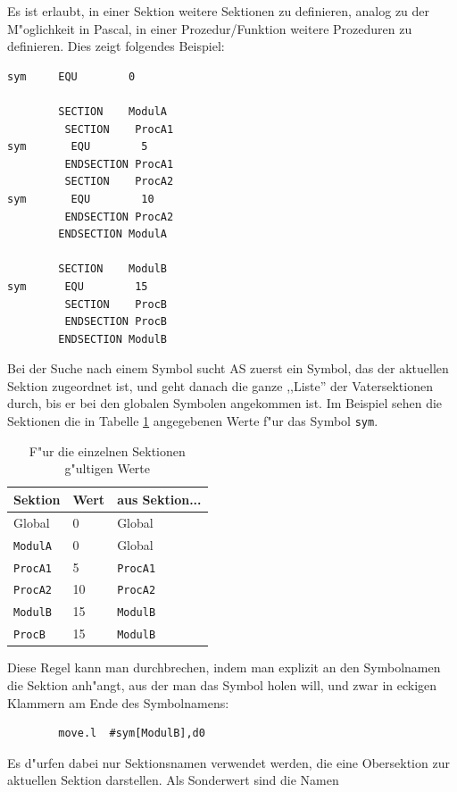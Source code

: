 \documentclass[12pt,a4paper,twoside]{report}
\newcommand{\tty}[1]{{\tt #1}}
\newcommand{\asname}{AS}
\begin{document}
Es ist erlaubt, in einer Sektion weitere Sektionen zu definieren, analog
zu der M"oglichkeit in Pascal, in einer Prozedur/Funktion weitere
Prozeduren zu definieren.  Dies zeigt folgendes Beispiel:
\begin{verbatim}
sym     EQU        0

        SECTION    ModulA
         SECTION    ProcA1
sym       EQU        5
         ENDSECTION ProcA1
         SECTION    ProcA2
sym       EQU        10
         ENDSECTION ProcA2
        ENDSECTION ModulA

        SECTION    ModulB
sym      EQU        15
         SECTION    ProcB
         ENDSECTION ProcB
        ENDSECTION ModulB
\end{verbatim}
Bei der Suche nach einem Symbol sucht \asname{} zuerst ein Symbol, das der aktuellen
Sektion zugeordnet ist, und geht danach die ganze ,,Liste'' der Vatersektionen
durch, bis er bei den globalen Symbolen angekommen ist.  Im Beispiel sehen
die Sektionen die in Tabelle \ref{TabSymErg} angegebenen Werte f"ur das Symbol
\tty{sym}.
\begin{table}[htb]
\begin{center}\begin{tabular}{|l|l|l|}
\hline
Sektion      &    Wert   &   aus Sektion... \\
\hline
\hline
Global       &     0     &    Global        \\
\hline
\tty{ModulA} &     0     &    Global        \\
\hline
\tty{ProcA1} &     5     &    \tty{ProcA1}  \\
\hline
\tty{ProcA2} &    10     &    \tty{ProcA2}  \\
\hline
\tty{ModulB} &    15     &    \tty{ModulB}  \\
\hline
\tty{ProcB}  &    15     &    \tty{ModulB}  \\
\hline
\end{tabular}\end{center}
\caption{F"ur die einzelnen Sektionen g"ultigen Werte\label{TabSymErg}}
\end{table}
Diese Regel kann man durchbrechen, indem man explizit an den Symbolnamen
die Sektion anh"angt, aus der man das Symbol holen will, und zwar in
eckigen Klammern am Ende des Symbolnamens:
\begin{verbatim}
        move.l  #sym[ModulB],d0
\end{verbatim}
Es d"urfen dabei nur Sektionsnamen verwendet werden, die eine Obersektion
zur aktuellen Sektion darstellen.  Als Sonderwert sind die Namen
\end{document}
